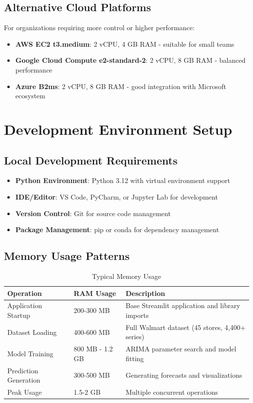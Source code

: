 \subsection*{Alternative Cloud Platforms}

For organizations requiring more control or higher performance:

\begin{itemize}
	\item \textbf{AWS EC2 t3.medium}: 2 vCPU, 4 GB RAM - suitable for small teams
	\item \textbf{Google Cloud Compute e2-standard-2}: 2 vCPU, 8 GB RAM - balanced performance
	\item \textbf{Azure B2ms}: 2 vCPU, 8 GB RAM - good integration with Microsoft ecosystem
\end{itemize}

\section*{Development Environment Setup}

\subsection*{Local Development Requirements}

\begin{itemize}
	\item \textbf{Python Environment}: Python 3.12 with virtual environment support
	\item \textbf{IDE/Editor}: VS Code, PyCharm, or Jupyter Lab for development
	\item \textbf{Version Control}: Git for source code management
	\item \textbf{Package Management}: pip or conda for dependency management
\end{itemize}

\subsection*{Memory Usage Patterns}

\begin{table}[H]
	\centering
	\caption{Typical Memory Usage}
	\begin{tabular}{|p{4cm}|p{3cm}|p{6cm}|}
		\hline
		\textbf{Operation} & \textbf{RAM Usage} & \textbf{Description} \\
		\hline
		Application Startup & 200-300 MB & Base Streamlit application and library imports \\
		\hline
		Dataset Loading & 400-600 MB & Full Walmart dataset (45 stores, 4,400+ series) \\
		\hline
		Model Training & 800 MB - 1.2 GB & ARIMA parameter search and model fitting \\
		\hline
		Prediction Generation & 300-500 MB & Generating forecasts and visualizations \\
		\hline
		Peak Usage & 1.5-2 GB & Multiple concurrent operations \\
		\hline
	\end{tabular}
	\label{tab:memory-usage}
\end{table}

